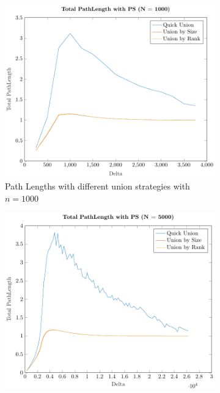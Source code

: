 \begin{figure}[ht]
    \centering
    \begin{subfigure}{0.32\textwidth}
        \centering
        \includegraphics[width=\textwidth]{../images/plotPSFull1000_PathLength.pdf}
        \caption{Path Lengths with different union strategies with $n = 1000$}
    \end{subfigure}%
    \hfill
    \begin{subfigure}{0.32\textwidth}
        \centering
        \includegraphics[width=\textwidth]{../images/plotPSFull5000_PathLength.pdf}

\end{subfigure}
\end{figure}
